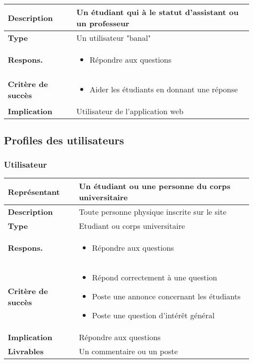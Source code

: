\begin{center}

\begin{tabular}{| >{\bfseries} M{85pt} | M{250pt} |}
	\hline
	Description & Un étudiant qui à le statut d'assistant ou un professeur \tabularnewline
	\hline
	Type & Un utilisateur "banal" \tabularnewline
	\hline
	Respons. &
	\begin{itemize}
		\item Répondre aux questions
	\end{itemize} \tabularnewline
	\hline
	Critère de succès &
	\begin{itemize}
		\item Aider les étudiants en donnant une réponse
	\end{itemize} \tabularnewline
	\hline
	Implication & Utilisateur de l'application web \tabularnewline
	\hline

\end{tabular}

\end{center}


\subsection{Profiles des utilisateurs}
\subsubsection{Utilisateur}

\begin{center}

\begin{tabular}{| >{\bfseries} M{85pt} | M{250pt} |}
	\hline
	Représentant & Un étudiant ou une personne du corps universitaire \tabularnewline
	\hline
	Description & Toute personne physique inscrite sur le site \tabularnewline
	\hline
	Type & Etudiant ou corps universitaire \tabularnewline
	\hline
	Respons. &
	\begin{itemize}
		\item Répondre aux questions
	\end{itemize} \tabularnewline
	\hline
	Critère de succès &
	\begin{itemize}
		\item Répond correctement à une question
		\item Poste une annonce concernant les étudiants
		\item Poste une question d'intérêt général
	\end{itemize} \tabularnewline
	\hline
	Implication & Répondre aux questions \tabularnewline
	\hline
	Livrables & Un commentaire ou un poste \tabularnewline
	\hline
\end{tabular}

\end{center}

